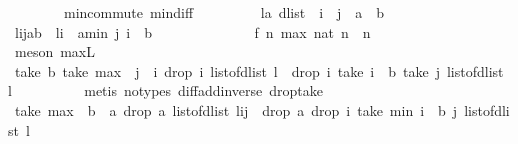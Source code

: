 \begin{isabellebody}
\ \ \ \ \ \ \ \ min{\isachardot}commute\ min{\isacharunderscore}diff{\isacharparenright}\isanewline
\ \ \isamarkupfalse%
\isanewline
\ \ \isamarkupfalse%
\isanewline
\ \ \isamarkupfalse%
\ l{\isacharcolon}{\isacharcolon}{\isachardoublequoteopen}{\isacharprime}a\ dlist{\isachardoublequoteclose}\ \ i\ \ j\ \ a\ \ b\isanewline
\ \ \isamarkupfalse%
\ {\isachardoublequoteopen}{\isacharparenleft}l{\isasymdagger}i{\isachardot}{\isachardot}j{\isacharparenright}{\isasymdagger}a{\isachardot}{\isachardot}b\ {\isacharequal}\ l{\isasymdagger}{\isacharparenleft}i\ {\isacharplus}\ a{\isacharparenright}{\isachardot}{\isachardot}{\isacharparenleft}min\ j\ {\isacharparenleft}i\ {\isacharplus}\ b{\isacharparenright}{\isacharparenright}{\isachardoublequoteclose}\isanewline
\ \ \ \ \isamarkupfalse%
\ {\isacharminus}\isanewline
\ \ \ \ \ \ \isamarkupfalse%
\ f{}{\isacharcolon}\ {\isachardoublequoteopen}{\isasymforall}n{\isachardot}\ max\ {\isacharparenleft}{}{\isacharcolon}{\isacharcolon}nat{\isacharparenright}\ n\ {\isacharequal}\ n{\isachardoublequoteclose}\isanewline
\ \ \ \ \ \ \ \ \isamarkupfalse%
\ {\isacharparenleft}meson\ max{\isacharunderscore}{}L{\isacharparenright}\isanewline
\ \ \ \ \ \ \isamarkupfalse%
\ {\isachardoublequoteopen}take\ b\ {\isacharparenleft}take\ {\isacharparenleft}max\ {}\ {\isacharparenleft}j\ {\isacharminus}\ i{\isacharparenright}{\isacharparenright}\ {\isacharparenleft}drop\ i\ {\isacharparenleft}list{\isacharunderscore}of{\isacharunderscore}dlist\ l{\isacharparenright}{\isacharparenright}{\isacharparenright}\ {\isacharequal}\ drop\ i\ {\isacharparenleft}take\ {\isacharparenleft}i\ {\isacharplus}\ b{\isacharparenright}\ {\isacharparenleft}take\ j\ {\isacharparenleft}list{\isacharunderscore}of{\isacharunderscore}dlist\ l{\isacharparenright}{\isacharparenright}{\isacharparenright}{\isachardoublequoteclose}\isanewline
\ \ \ \ \ \ \ \ \isamarkupfalse%
\ {\isacharparenleft}metis\ {\isacharparenleft}no{\isacharunderscore}types{\isacharparenright}\ diff{\isacharunderscore}add{\isacharunderscore}inverse\ drop{\isacharunderscore}take{\isacharparenright}\isanewline
\ \ \ \ \ \ \isamarkupfalse%
\ {\isachardoublequoteopen}take\ {\isacharparenleft}max\ {}\ {\isacharparenleft}b\ {\isacharminus}\ a{\isacharparenright}{\isacharparenright}\ {\isacharparenleft}drop\ a\ {\isacharparenleft}list{\isacharunderscore}of{\isacharunderscore}dlist\ {\isacharparenleft}l{\isasymdagger}i{\isachardot}{\isachardot}j{\isacharparenright}{\isacharparenright}{\isacharparenright}\ {\isacharequal}\ drop\ a\ {\isacharparenleft}drop\ i\ {\isacharparenleft}take\ {\isacharparenleft}min\ {\isacharparenleft}i\ {\isacharplus}\ b{\isacharparenright}\ j{\isacharparenright}\ {\isacharparenleft}list{\isacharunderscore}of{\isacharunderscore}dlist\ l{\isacharparenright}{\isacharparenright}{\isacharparenright}{\isachardoublequoteclose}\isanewline

\end{isabellebody}
